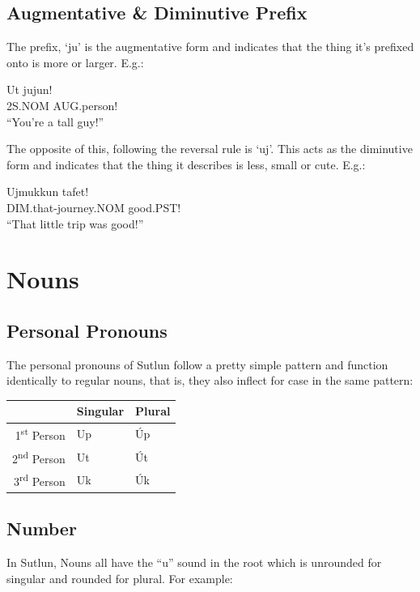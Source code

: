 \documentclass{book}
\begin{document}
\subsection{Augmentative \& Diminutive Prefix}
The prefix, `ju' is the augmentative form and indicates that the thing it's prefixed onto
is more or larger. E.g.:

\begin{exe}
    \ex
    \gll Ut jujun!\\
    2S.NOM AUG.person! \\
    \glt ``You're a tall guy!''
\end{exe}

The opposite of this, following the reversal rule is `uj'. This acts as the diminutive form
and indicates that the thing it describes is less, small or cute. E.g.:

\begin{exe}
    \ex
    \gll Ujmukkun tafet! \\
    DIM.that-journey.NOM good.PST! \\
    \glt ``That little trip was good!''
\end{exe}


\section{Nouns}
\subsection{Personal Pronouns}
The personal pronouns of Sutlun follow a pretty simple pattern and function identically to regular nouns,
that is, they also inflect for case in the same pattern:

\begin{center}
    \begin{tabular}{|r|l|l|}
        \hline
        & Singular    & Plural \\
        \hline
        1\textsuperscript{st} Person & Up & Úp \\
        2\textsuperscript{nd} Person & Ut & Út \\
        3\textsuperscript{rd} Person & Uk & Úk \\
        \hline
    \end{tabular}
\end{center}

\subsection{Number}
In Sutlun, Nouns all have the ``u'' sound in the root which is unrounded for singular and rounded for plural.
For example:
\end{document}
